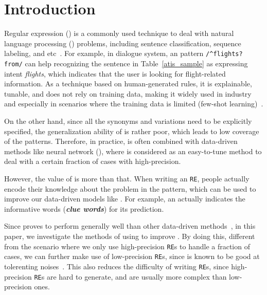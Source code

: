 \section{Introduction}



Regular expression (\RE) is a commonly used technique to deal with natural language processing (\NLP) problems, including sentence
classification, sequence labeling, and etc~\cite{chang2014tokensregex}. For example, in dialogue system, an \RE pattern \texttt{/\textasciicircum flights? from/} can
help recognizing the sentence in Table~\ref{atis_sample} as expressing intent \emph{flights}, which indicates that the user is looking for
flight-related information. As a technique based on human-generated rules, it is explainable, tunable, and does not rely on training data,
making it widely used in industry and especially in scenarios where the training data is limited (few-shot learning)~\cite{gc2015big}.

On the other hand, since all the synonyms and variations need to be explicitly specified, the generalization ability of \RE is rather poor,
which leads to low coverage of the patterns. Therefore, in practice, \RE is often combined with data-driven methods like neural network
(\NN), where \RE is considered as an easy-to-tune method to deal with a certain fraction of cases with high-precision.

However, the value of \RE is more than that. When writing an \texttt{RE}, people actually encode their knowledge about the problem in the
pattern, which can be used to improve our data-driven models like \NN. For example, an \RE actually indicates the informative words
(\textbf{\emph{clue words}}) for its prediction.

Since \NN proves to perform generally well than other data-driven methods~\cite{kim2014convolutional, bahdanau2014neural}, in this paper,
we investigate the methods of using \RE to improve \NN. By doing this, different from the scenario where we only use high-precision
\texttt{RE}s to handle a fraction of cases, we can further make use of low-precision \texttt{RE}s, since \NN is known to be good at
tolerenting noises~\cite{xie2016disturblabel}. This also reduces the difficulty of writing \texttt{RE}s, since high-precision \texttt{RE}s
are hard to generate, and are usually more complex than low-precision ones.

